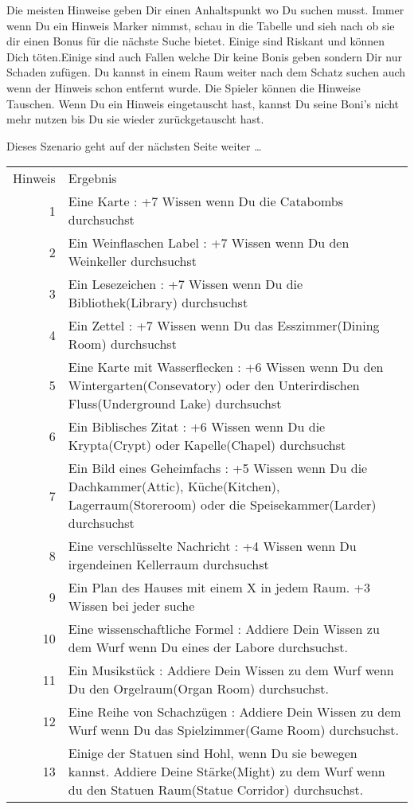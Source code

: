 \begin{itemize}
        \bitem Die meisten Hinweise geben Dir einen Anhaltspunkt wo Du suchen musst.
        Immer wenn Du ein Hinweis Marker nimmst, schau in die Tabelle und sieh nach ob sie dir einen Bonus für die nächste Suche bietet. Einige sind Riskant und können Dich töten.Einige sind auch Fallen welche Dir keine Bonis geben sondern Dir nur Schaden zufügen.
    \bitem Du kannst in einem Raum weiter nach dem Schatz suchen auch wenn der Hinweis schon entfernt wurde.
    \bitem Die Spieler können die Hinweise Tauschen.
    \bitem Wenn Du ein Hinweis eingetauscht hast, kannst Du seine Boni's nicht mehr nutzen bis Du sie wieder zurückgetauscht hast.
\end{itemize}

\vspace{2cm}

Dieses Szenario geht auf der nächsten Seite weiter …

\newpage

\begin{tabular}{rp{7cm}}
Hinweis & Ergebnis \\
{1} &
Eine Karte : +7 Wissen wenn Du die Catabombs durchsuchst \\
{2} &
Ein Weinflaschen Label : +7 Wissen wenn Du den Weinkeller durchsuchst \\
{3} &
Ein Lesezeichen : +7 Wissen wenn Du die Bibliothek(Library) durchsuchst \\
{4} &
Ein Zettel : +7 Wissen wenn Du das Esszimmer(Dining Room) durchsuchst \\
{5} &
Eine Karte mit Wasserflecken : +6 Wissen wenn Du den Wintergarten(Consevatory) oder den Unterirdischen Fluss(Underground Lake) durchsuchst \\
{6} &
Ein Biblisches Zitat : +6 Wissen wenn Du die Krypta(Crypt) oder Kapelle(Chapel) durchsuchst \\
{7} &
Ein Bild eines Geheimfachs : +5 Wissen wenn Du die Dachkammer(Attic), Küche(Kitchen), Lagerraum(Storeroom) oder die Speisekammer(Larder) durchsuchst \\
{8} &
Eine verschlüsselte Nachricht : +4 Wissen wenn Du irgendeinen Kellerraum durchsuchst \\
{9} &
Ein Plan des Hauses mit einem X in jedem Raum. +3 Wissen bei jeder suche \\
{10} &
Eine wissenschaftliche Formel : Addiere Dein Wissen zu dem Wurf wenn Du eines der Labore durchsuchst. \\
{11} &
Ein Musikstück : Addiere Dein Wissen zu dem Wurf wenn Du den Orgelraum(Organ Room) durchsuchst. \\
{12} &
Eine Reihe von Schachzügen : Addiere Dein Wissen zu dem Wurf wenn Du das Spielzimmer(Game Room) durchsuchst. \\
{13} &
Einige der Statuen sind Hohl, wenn Du sie bewegen kannst. Addiere Deine Stärke(Might) zu dem Wurf wenn du den Statuen Raum(Statue Corridor) durchsuchst. \\
\end{tabular}


